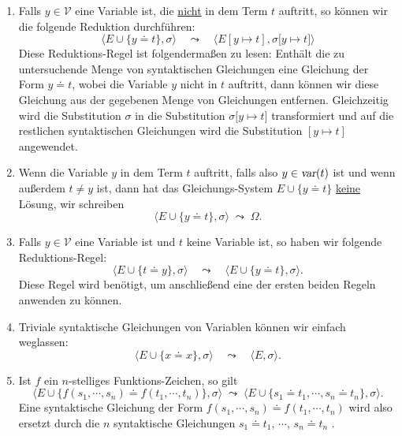 \begin{enumerate}
\item Falls $y\in\mathcal{V}$ eine Variable ist, die \underline{\color{red}nicht} in dem Term $t$ auftritt, so
      k\"{o}nnen wir die folgende Reduktion durchf\"{u}hren: 
      \[ \Big\langle E \cup \big\{ y \doteq t \big\}, \sigma \Big\rangle \quad\leadsto\quad 
         \Big\langle E[y \mapsto t], \sigma\big[ y \mapsto t \big] \Big\rangle 
      \]
      Diese Reduktions-Regel ist folgenderma\ss{}en zu lesen: Enth\"{a}lt die zu untersuchende
      Menge von syntaktischen Gleichungen eine Gleichung der Form $y \doteq t$, wobei die
      Variable $y$ nicht in $t$ auftritt, dann k\"{o}nnen wir diese Gleichung aus der
      gegebenen Menge von Gleichungen entfernen.  Gleichzeitig wird die Substitution
      $\sigma$ in die Substitution $\sigma\big[ y \mapsto t \big]$ transformiert und auf die restlichen syntaktischen Gleichungen
      wird die Substitution $[y \mapsto t]$ angewendet.
\item Wenn die Variable $y$  in dem Term $t$ auftritt, falls also $y \in \textsl{var}(t)$
      ist und wenn au\ss{}erdem $t \not= y$ ist, dann hat das Gleichungs-System 
      $E \cup \big\{ y \doteq t \big\}$ \underline{\color{red}keine} L\"{o}sung, wir schreiben 
      \[ \Big\langle E \cup \big\{ y \doteq t \big\}, \sigma \Big\rangle\;\leadsto\; \Omega. \]
\item Falls $y\in\mathcal{V}$ eine Variable ist und $t$ keine Variable ist, so haben wir folgende Reduktions-Regel:
      \[ \Big\langle E \cup \big\{ t \doteq y \big\}, \sigma \Big\rangle \quad\leadsto\quad 
         \Big\langle E \cup \big\{ y \doteq t \big\}, \sigma \Big\rangle.
      \]   
      Diese Regel wird ben\"{o}tigt, um anschlie\ss{}end eine der ersten beiden Regeln anwenden zu
      k\"{o}nnen.
\item Triviale syntaktische Gleichungen von Variablen k\"{o}nnen wir einfach weglassen:
      \[ \Big\langle E \cup \big\{ x \doteq x \big\}, \sigma \Big\rangle \quad\leadsto\quad
         \Big\langle E, \sigma \Big\rangle.
      \]   
\item Ist $f$ ein $n$-stelliges Funktions-Zeichen, so gilt 
      \[ \Big\langle E \cup \big\{ f(s_1,\cdots,s_n) \doteq f(t_1,\cdots,t_n) \big\}, \sigma \Big\rangle 
         \;\leadsto\; 
         \Big\langle E \cup \big\{ s_1 \doteq t_1, \cdots, s_n \doteq t_n\}, \sigma \Big\rangle.
      \]   
      Eine syntaktische Gleichung der Form $f(s_1,\cdots,s_n) \doteq f(t_1,\cdots,t_n)$
      wird also ersetzt durch die $n$ syntaktische Gleichungen $s_1 \doteq t_1$, $\cdots$, $s_n \doteq t_n$      .


\end{enumerate}
